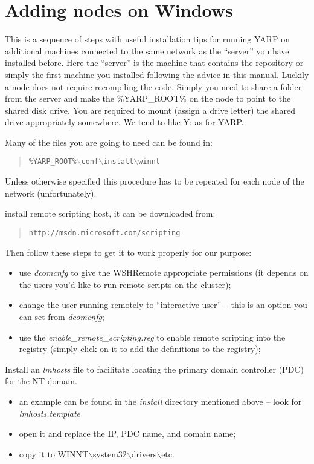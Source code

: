 \section{Adding nodes on Windows}

This is a sequence of steps with useful installation tips for running YARP on additional machines connected to the same network as the ``server'' you have installed before. Here the ``server'' is the machine that contains the repository or simply the first machine you installed following the advice in this manual. Luckily a node does not require recompiling the code. Simply you need to share a folder from the server and make the \%YARP\_ROOT\% on the node to point to the shared disk drive. You are required to mount (assign a drive letter) the shared drive appropriately somewhere. We tend to like Y: as for YARP. 

Many of the files you are going to need can be found in:
\begin{quote}
\tt{\%YARP\_ROOT\%$\backslash$conf$\backslash$install$\backslash$winnt}
\end{quote}
Unless otherwise specified this procedure has to be repeated for each node of the network (unfortunately).

\vspace{1cm}
 install remote scripting host, it can be downloaded from:
\begin{quote}
\tt{http://msdn.microsoft.com/scripting}
\end{quote}

Then follow these steps to get it to work properly for our purpose:
\begin{itemize}
\item use {\em dcomcnfg} to give the WSHRemote appropriate permissions (it depends on the users you'd like to run remote scripts on the cluster);
\item change the user running remotely to ``interactive user'' -- this is an option you can set from {\em dcomcnfg};
\item use the {\em enable\_remote\_scripting.reg} to enable remote scripting into the registry (simply click on it to add the definitions to the registry);
\end{itemize}

 Install an {\em lmhosts} file to facilitate locating the primary domain controller (PDC) for the NT domain.
\begin{itemize}
\item an example can be found in the {\em install} directory mentioned above -- look for {\em lmhosts.template}
\item open it and replace the IP, PDC name, and domain name;
\item copy it to WINNT$\backslash$system32$\backslash$drivers$\backslash$etc.
\end{itemize}

